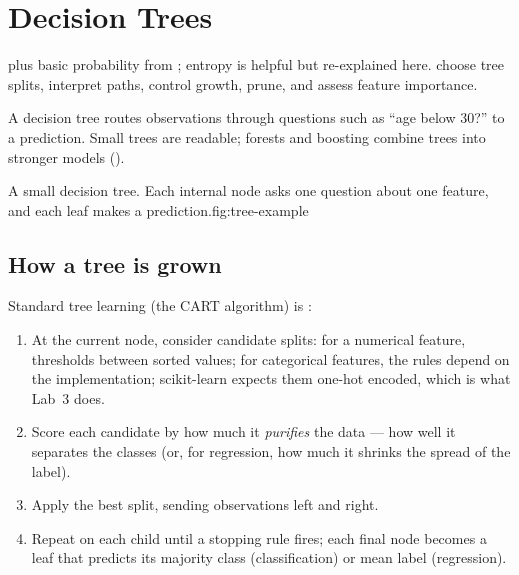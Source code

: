 \chapter{Decision Trees}
\label{ch:decision-trees}

\chapterguide%
  { plus basic probability from ; entropy is helpful but re-explained here.}
  {choose tree splits, interpret paths, control growth, prune, and assess feature importance.}

A decision tree routes observations through questions such as ``age below 30?'' to a  prediction. Small trees are readable; forests and boosting combine trees into stronger models ().

\begin{utpfig}{A small decision tree. Each internal node asks one question about one feature, and each leaf makes a prediction.}{fig:tree-example}
\end{utpfig}

\section{How a tree is grown}
\label{sec:decision-tree}

Standard tree learning (the CART algorithm) is :

\begin{enumerate}
  \item At the current node, consider candidate splits: for a numerical feature, thresholds between sorted values; for categorical features, the rules depend on the implementation; scikit-learn expects them one-hot encoded, which is what Lab~3 does.
  \item Score each candidate by how much it \emph{purifies} the data --- how well it separates the classes (or, for regression, how much it shrinks the spread of the label).
  \item Apply the best split, sending observations left and right.
  \item Repeat on each child until a stopping rule fires; each final node becomes a leaf that predicts its majority class (classification) or mean label (regression).
\end{enumerate}

